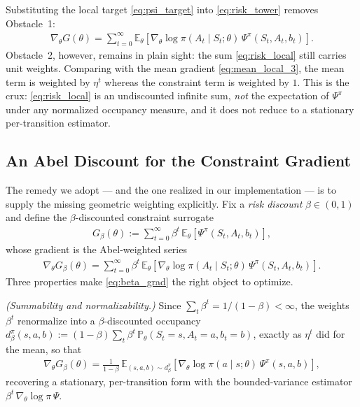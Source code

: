 Substituting the local target \eqref{eq:psi_target} into \eqref{eq:risk_tower} removes Obstacle~1:
\begin{align}\label{eq:risk_local}
    \nabla_{\theta}G(\theta)
    =
    \sum_{t=0}^{\infty}
    \mathbb{E}_{\theta}\!\left[
        \nabla_{\theta}\log\pi(A_t\mid S_t;\theta)\,
        \Psi^{\pi}(S_t,A_t,b_t)
    \right].
\end{align}
Obstacle~2, however, remains in plain sight: the sum \eqref{eq:risk_local} still carries unit weights. Comparing with the mean gradient \eqref{eq:mean_local_3}, the mean term is weighted by $\eta^t$ whereas the constraint term is weighted by $1$. This is the crux: \eqref{eq:risk_local} is an undiscounted infinite sum, \emph{not} the expectation of $\Psi^{\pi}$ under any normalized occupancy measure, and it does not reduce to a stationary per-transition estimator.

\subsection{An Abel Discount for the Constraint Gradient}\label{sec:beta}
The remedy we adopt --- and the one realized in our implementation --- is to supply the missing geometric weighting explicitly. Fix a \emph{risk discount} $\beta\in(0,1)$ and define the $\beta$-discounted constraint surrogate
\begin{align}
    G_{\beta}(\theta)
    :=
    \sum_{t=0}^{\infty}\beta^t\,\mathbb{E}_{\theta}\!\left[\Psi^{\pi}(S_t,A_t,b_t)\right],
\end{align}
whose gradient is the Abel-weighted series
\begin{align}\label{eq:beta_grad}
    \nabla_{\theta}G_{\beta}(\theta)
    =
    \sum_{t=0}^{\infty}\beta^t\,
    \mathbb{E}_{\theta}\!\left[
        \nabla_{\theta}\log\pi(A_t\mid S_t;\theta)\,
        \Psi^{\pi}(S_t,A_t,b_t)
    \right].
\end{align}
Three properties make \eqref{eq:beta_grad} the right object to optimize.

\emph{(Summability and normalizability.)} Since $\sum_t\beta^t=1/(1-\beta)<\infty$, the weights $\beta^t$ renormalize into a $\beta$-discounted occupancy $d_{\beta}^{\pi}(s,a,b):=(1-\beta)\sum_{t}\beta^t\,\mathbb{P}_{\theta}(S_t=s,A_t=a,b_t=b)$, exactly as $\eta^t$ did for the mean, so that
\begin{align}\label{eq:beta_stationary}
    \nabla_{\theta}G_{\beta}(\theta)
    =
    \frac{1}{1-\beta}\,
    \mathbb{E}_{(s,a,b)\sim d_{\beta}^{\pi}}\!\left[
        \nabla_{\theta}\log\pi(a\mid s;\theta)\,
        \Psi^{\pi}(s,a,b)
    \right],
\end{align}
recovering a stationary, per-transition form with the bounded-variance estimator $\beta^t\,\nabla_{\theta}\log\pi\,\Psi$.

